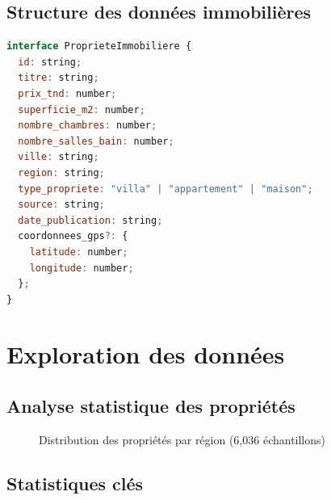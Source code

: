 \documentclass[12pt,a4paper]{report}
\begin{document}
\subsection{Structure des données immobilières}

\begin{lstlisting}[caption=Interface TypeScript des propriétés immobilières, language=javascript]
interface ProprieteImmobiliere {
  id: string;
  titre: string;
  prix_tnd: number;
  superficie_m2: number;
  nombre_chambres: number;
  nombre_salles_bain: number;
  ville: string;
  region: string;
  type_propriete: "villa" | "appartement" | "maison";
  source: string;
  date_publication: string;
  coordonnees_gps?: {
    latitude: number;
    longitude: number;
  };
}
\end{lstlisting}

\section{Exploration des données}

\subsection{Analyse statistique des propriétés}

\begin{figure}[H]
    \centering
    \caption{Distribution des propriétés par région (6,036 échantillons)}
\end{figure}

\subsection{Statistiques clés}
\end{document}
